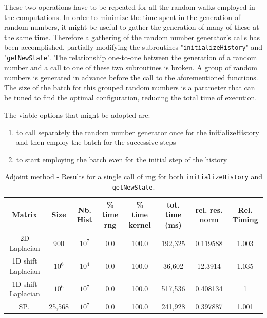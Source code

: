 \documentclass[a4paper,10pt]{article}
\begin{document}
These two operations have to be repeated for all the random walks employed in 
the computations. 
In order to minimize the time spent in the generation of random numbers, it 
might be useful
to gather the generation of many of these at the same time. 
Therefore a gathering of the random number generator's calls has been 
accomplished, partially modifying 
the subroutines "\texttt{initializeHistory}" and "\texttt{getNewState}".
The relationship one-to-one between the generation of a random number and a call 
to one of these two 
subroutines is broken. A group of random numbers is generated in advance before 
the call to the
aforementioned functions. The size of the batch for this grouped random numbers 
is a parameter that can be tuned to find the optimal configuration, 
reducing the total time 
of execution.

The viable options that might be adopted are:
\begin{enumerate}
 \item to call separately the random number generator once for the 
initializeHistory and then
   employ the batch for the successive steps
  \item to start employing the batch even for the initial step of the history 
\end{enumerate}



\begin{table}[!h]
\hspace*{-2.5cm}
\begin{tabular}{|c|c|c|c|c|c|c|c|}
\hline
\textbf{Matrix} & \textbf{Size} &\textbf{Nb. Hist} & \textbf{\% time rng} 
& \textbf{\% time kernel} & tot. time (ms)& rel. res. norm & Rel. Timing\\
\hline
2D Laplacian& 900 & $10^7$ & 0.0 & 100.0 & 192,325 & 0.119588 & 1.003\\
\hline 
1D shift Laplacian& $10^6$ & $10^4$ & 0.0 & 100.0 & 36,602 & 12.3914 & 1.035\\
\hline
1D shift Laplacian& $10^6$ & $10^7$ & 0.0 & 100.0 & 517,536 & 0.408134 & 1\\
\hline
$\text{SP}_1$ & 25,568 & $10^7$ & 0.0 & 100.0 & 241,928 & 0.397887 & 1.001\\
\hline
\end{tabular}
\caption{Adjoint method - Results for a single call of rng for both 
\texttt{initializeHistory} 
and \texttt{getNewState}.} 
\label{tab18}
\end{table}
\end{document}
